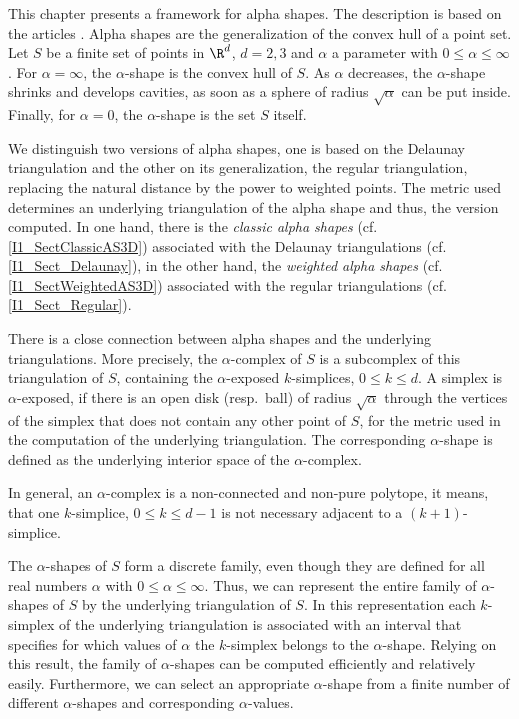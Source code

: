 This chapter presents a framework for alpha shapes. The description is based on
the articles \cite{em-tdas-94,e-was-92}. Alpha shapes are
the generalization of the convex hull of a point set. Let $S$ be a finite set of
points in $\R^d$, $d = 2,3$ and $\alpha$ a parameter with $0 \leq \alpha \leq
\infty$. For $\alpha = \infty$, the $\alpha$-shape is the convex hull of $S$. As 
$\alpha$ decreases, the $\alpha$-shape shrinks and develops cavities, as soon as 
a sphere of radius $\sqrt{\alpha}$ can be put inside.
Finally, for $\alpha = 0$, the $\alpha$-shape is the set $S$ itself.

We distinguish two versions of alpha shapes, one is based on the Delaunay
triangulation and the other on its generalization, the regular triangulation,
replacing the natural distance by the power to weighted points. The metric used
determines an underlying triangulation of the alpha shape and thus, the version
computed. 
In one hand, there is the {\em classic alpha shapes}
(cf. \ref{I1_SectClassicAS3D}) associated with the Delaunay triangulations
(cf. \ref{I1_Sect_Delaunay}), in the other hand, the {\em weighted alpha shapes}
(cf. \ref{I1_SectWeightedAS3D}) associated with the regular triangulations
(cf. \ref{I1_Sect_Regular}). 

There is a close connection between alpha shapes and the underlying
triangulations. More precisely, the $\alpha$-complex of $S$ is a
subcomplex of this triangulation of $S$, containing the $\alpha$-exposed
$k$-simplices, $0 \leq k \leq d$. A simplex is $\alpha$-exposed, if there is an
open disk (resp.\ ball) of radius $\sqrt{\alpha}$ through the vertices of the
simplex that does not contain any other point of $S$, for the metric used in
the computation of the underlying triangulation.  The corresponding
$\alpha$-shape is defined as the underlying interior space of the
$\alpha$-complex. 

In general, an $\alpha$-complex is a non-connected and non-pure polytope, it
means, that one $k$-simplice, $0 \leq k \leq d-1$ is not necessary adjacent to
a $(k+1)$-simplice.

The $\alpha$-shapes of $S$ form a discrete family, even though they
are defined for all real numbers $\alpha$ with $0 \leq \alpha
\leq \infty$. Thus, we can represent the entire family of $\alpha$-shapes
of $S$ by the underlying triangulation of $S$. In this representation
each $k$-simplex of the underlying triangulation is associated with an
interval that specifies for which values of $\alpha$ the $k$-simplex
belongs to the $\alpha$-shape. Relying on this result, the family of
$\alpha$-shapes can be computed efficiently and relatively
easily. Furthermore, we can select an appropriate $\alpha$-shape from a
finite number of different $\alpha$-shapes and corresponding
$\alpha$-values.

